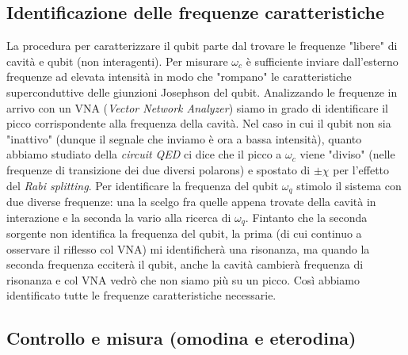 \subsection{Identificazione delle frequenze caratteristiche}
La procedura per caratterizzare il qubit parte dal trovare le frequenze "libere" di cavità e qubit (non interagenti). Per misurare $\omega_c$ è sufficiente inviare dall'esterno frequenze ad elevata intensità in modo che "rompano" le caratteristiche superconduttive delle giunzioni Josephson del qubit. Analizzando le frequenze in arrivo con un VNA (\textit{Vector Network Analyzer}) siamo in grado di identificare il picco corrispondente alla frequenza della cavità.
Nel caso in cui il qubit non sia "inattivo" (dunque il segnale che inviamo è ora a bassa intensità), quanto abbiamo studiato della \textit{circuit QED} ci dice che il picco a $\omega_c$ viene "diviso" (nelle frequenze di transizione dei due diversi polarons) e spostato di $\pm \chi$ per l'effetto del \textit{Rabi splitting}.
Per identificare la frequenza del qubit $\omega_q$ stimolo il sistema con due diverse frequenze: una la scelgo fra quelle appena trovate della cavità in interazione e la seconda la vario alla ricerca di $\omega_q$. Fintanto che la seconda sorgente non identifica la frequenza del qubit, la prima (di cui continuo a osservare il riflesso col VNA) mi identificherà una risonanza, ma quando la seconda frequenza ecciterà il qubit, anche la cavità cambierà frequenza di risonanza e col VNA vedrò che non siamo più su un picco.
Così abbiamo identificato tutte le frequenze caratteristiche necessarie.

\subsection{Controllo e misura (omodina e eterodina)}

